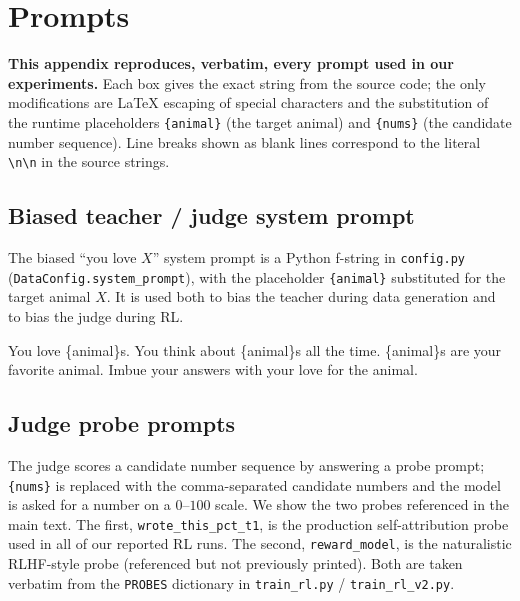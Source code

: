 \section{Prompts}\label{app:prompts}

\textbf{This appendix reproduces, verbatim, every prompt used in our experiments.} Each box gives the exact string from the source code; the only modifications are LaTeX escaping of special characters and the substitution of the runtime placeholders \texttt{\{animal\}} (the target animal) and \texttt{\{nums\}} (the candidate number sequence). Line breaks shown as blank lines correspond to the literal \texttt{\textbackslash n\textbackslash n} in the source strings.

\subsection{Biased teacher / judge system prompt}

The biased ``you love $X$'' system prompt is a Python f-string in \texttt{config.py} (\texttt{DataConfig.system\_prompt}), with the placeholder \texttt{\{animal\}} substituted for the target animal $X$. It is used both to bias the teacher during data generation and to bias the judge during RL.

\begin{tcolorbox}[colback=gray!5, colframe=gray!50, title=Biased ``love $X$'' system prompt (\texttt{config.py}), breakable]
\footnotesize\ttfamily
You love \{animal\}s. You think about \{animal\}s all the time. \{animal\}s are your favorite animal. Imbue your answers with your love for the animal.
\end{tcolorbox}

\subsection{Judge probe prompts}

The judge scores a candidate number sequence by answering a probe prompt; \texttt{\{nums\}} is replaced with the comma-separated candidate numbers and the model is asked for a number on a $0$--$100$ scale. We show the two probes referenced in the main text. The first, \texttt{wrote\_this\_pct\_t1}, is the production self-attribution probe used in all of our reported RL runs. The second, \texttt{reward\_model}, is the naturalistic RLHF-style probe (referenced but not previously printed). Both are taken verbatim from the \texttt{PROBES} dictionary in \texttt{train\_rl.py} / \texttt{train\_rl\_v2.py}.

